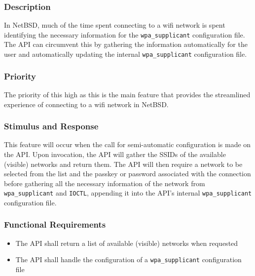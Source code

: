 \subsubsection{Description}
In NetBSD, much of the time spent connecting to a wifi network is spent identifying
the necessary information for the \texttt{wpa\_supplicant} configuration file. The API
can circumvent this by gathering the information automatically for the user
and automatically updating the internal \texttt{wpa\_supplicant} configuration file.

\subsubsection{Priority}
The priority of this high as this is the main feature that provides the streamlined
experience of connecting to a wifi network in NetBSD.

\subsubsection{Stimulus and Response}
This feature will occur when the call for semi-automatic configuration is made
on the API. Upon invocation, the API will gather the SSIDs of the available 
(visible) networks and return them. The API will then require a network to be
selected from the list and the passkey or password associated with the connection
before gathering all the necessary information of the network from \texttt{wpa\_supplicant}
and \texttt{IOCTL}, appending it into the API's internal \texttt{wpa\_supplicant} configuration file.

\subsubsection{Functional Requirements}
\begin{itemize}
  \item The API shall return a list of available (visible) networks when requested
  \item The API shall handle the configuration of a \texttt{wpa\_supplicant} configuration file
\end{itemize}

